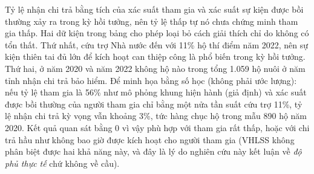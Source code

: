 \documentclass[12pt,a4paper]{article}
\begin{document}
Tỷ lệ nhận chi trả bằng tích của xác suất tham gia và xác suất sự kiện được bồi thường xảy ra trong kỳ hồi tưởng, nên tỷ lệ thấp tự nó chưa chứng minh tham gia thấp. Hai dữ kiện trong bảng cho phép loại bỏ cách giải thích chỉ do không có tổn thất. Thứ nhất, cứu trợ Nhà nước đến với 11\% hộ thí điểm năm 2022, nên sự kiện thiên tai đủ lớn để kích hoạt can thiệp công là phổ biến trong kỳ hồi tưởng. Thứ hai, ở năm 2020 và năm 2022 không hộ nào trong tổng 1.059 hộ nuôi ở năm tỉnh nhận chi trả bảo hiểm. Để minh họa bằng số học (không phải ước lượng): nếu tỷ lệ tham gia là 56\% như mô phỏng khung hiện hành (giả định) và xác suất được bồi thường của người tham gia chỉ bằng một nửa tần suất cứu trợ 11\%, tỷ lệ nhận chi trả kỳ vọng vẫn khoảng 3\%, tức hàng chục hộ trong mẫu 890 hộ năm 2020. Kết quả quan sát bằng 0 vì vậy phù hợp với tham gia rất thấp, hoặc với chi trả hầu như không bao giờ được kích hoạt cho người tham gia (VHLSS không phân biệt được hai khả năng này, và đây là lý do nghiên cứu này kết luận về \emph{độ phủ thực tế} chứ không về cầu).
\end{document}
